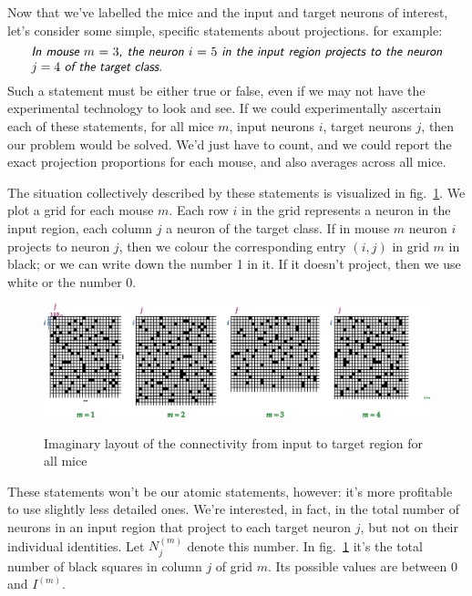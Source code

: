 \documentclass[\ifafour a4paper,12pt,\else a5paper,10pt,\fi%
onecolumn,oneside,article,%
british%
]{memoir}
\theoremstyle{remark}
\theoremstyle{innote}
\renewcommand*{\|}[1][]{\nonscript\,#1\vert\nonscript\;\mathopen{}}
\newcommand*{\fig}{fig.}%
\newcommand*{\statm}[1]{\textsl{\textsf{#1}}}
\newcommand*{\yIm}[1][m]{I^{(#1)}}
\newcommand*{\yNm}[1][m]{N^{(#1)}}
\begin{document}
\medskip


Now that we've labelled the mice and the input and target neurons of
interest, let's consider some simple, specific statements about
projections. for example:
\[\parbox{0.95\linewidth}{\statm{In mouse $m=3$, the neuron $i=5$ in the input
      region projects to the neuron $j=4$ of the target class.}}\]
Such a statement must be either true or false, even if we may not have the
experimental technology to look and see. If we could experimentally
ascertain each of these statements, for all mice $m$, input neurons $i$,
target neurons $j$, then our problem would be solved. We'd just have to
count, and we could report the exact projection proportions for each mouse,
and also averages across all mice.

The situation collectively described by these statements is visualized in
\fig~\ref{fig:cmij}. We plot a grid for each mouse $m$. Each row $i$ in the
grid represents a neuron in the input region, each column $j$ a neuron of
the target class. If in mouse $m$ neuron $i$ projects to neuron $j$, then
we colour the corresponding entry $(i,j)$ in grid $m$ in black; or we can
write down the number 1 in it. If it doesn't project, then we use white or
the number 0.
\begin{figure}[t!]%
 \centering\includegraphics[width=\linewidth]{bente_notes_drawings.png}\\
 \caption{Imaginary layout of the connectivity from input to target region
   for all mice}\label{fig:cmij}
\end{figure}%

\medskip

These statements won't be our atomic statements, however: it's more
profitable to use slightly less detailed ones. We're interested, in fact,
in the total number of neurons in an input region that project to each
target neuron $j$, but not on their individual identities. Let $\yNm_{j}$
denote this number. In \fig~\ref{fig:cmij} it's the total number of black
squares in column $j$ of grid $m$. Its possible values are between $0$ and
$\yIm$.
\end{document}
